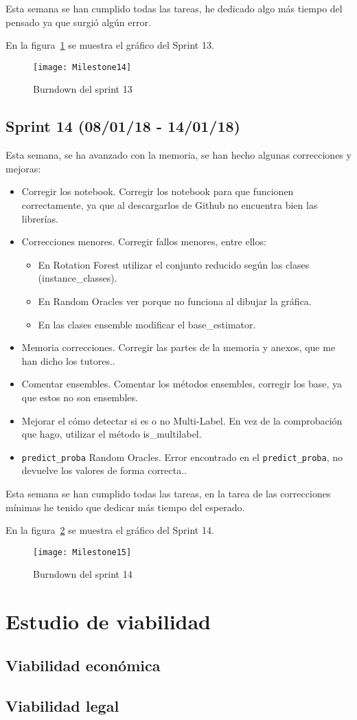 Esta semana se han cumplido todas las tareas, he dedicado algo más tiempo del pensado ya que surgió algún error.

En la figura~\ref{fig:Milestone14} se muestra el gráfico del Sprint 13.

\begin{figure}
\centering
\texttt{[image: Milestone14]}
\caption{Burndown del sprint 13}
\label{fig:Milestone14}
\end{figure}

\subsection{Sprint 14 (08/01/18 - 14/01/18)}
Esta semana, se ha avanzado con la memoria, se han hecho algunas correcciones y mejoras:
\begin{itemize}
\item Corregir los notebook. Corregir los notebook para que funcionen correctamente, ya que al descargarlos de Github no encuentra bien las librerías.
\item Correcciones menores. Corregir fallos menores, entre ellos:
	\begin{itemize}
		\item En Rotation Forest utilizar el conjunto reducido según las clases (instance\_classes).
		\item En Random Oracles ver porque no funciona al dibujar la gráfica.
		\item En las clases ensemble modificar el base\_estimator.
	\end{itemize}
\item Memoria correcciones. Corregir las partes de la memoria y anexos, que me han dicho los tutores..
\item Comentar ensembles. Comentar los métodos ensembles, corregir los base, ya que estos no son ensembles.
\item Mejorar el cómo detectar si es o no Multi-Label. En vez de la comprobación que hago, utilizar el método is\_multilabel.
\item \texttt{predict\_proba} Random Oracles. Error encontrado en el \texttt{predict\_proba}, no devuelve los valores de forma correcta..
\end{itemize}

Esta semana se han cumplido todas las tareas, en la tarea de las correcciones mínimas he tenido que dedicar más tiempo del esperado.

En la figura~\ref{fig:Milestone15} se muestra el gráfico del Sprint 14.

\begin{figure}
\centering
\texttt{[image: Milestone15]}
\caption{Burndown del sprint 14}
\label{fig:Milestone15}
\end{figure}

\section{Estudio de viabilidad}

\subsection{Viabilidad económica}

\subsection{Viabilidad legal}


